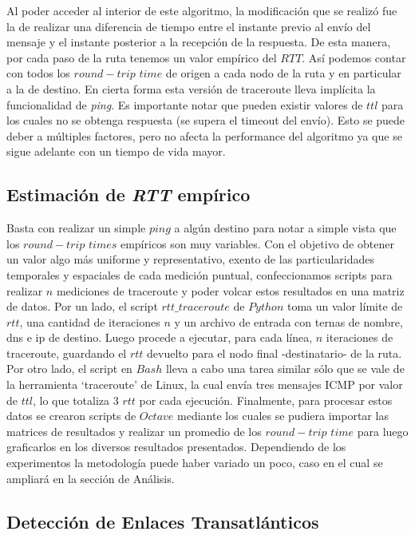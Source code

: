 \indent Al poder acceder al interior de este algoritmo, la modificación que se realizó fue la de realizar una diferencia de tiempo entre el instante previo al envío del mensaje y el instante posterior a la recepción de la respuesta. De esta manera, por cada paso de la ruta tenemos un valor empírico del $RTT$. Así podemos contar con todos los $round-trip$ $time$ de origen a cada nodo de la ruta y en particular a la de destino. En cierta forma esta versión de traceroute lleva implícita la funcionalidad de \textsl{ping}. Es importante notar que pueden existir valores de $ttl$ para los cuales no se obtenga respuesta (se supera el timeout del envío). Esto se puede deber a múltiples factores, pero no afecta la performance del algoritmo ya que se sigue adelante con un tiempo de vida mayor.\\

\subsection{Estimación de \textsl{RTT} empírico}

Basta con realizar un simple $ping$ a algún destino para notar a simple vista que los $round-trip$ $times$ empíricos son muy variables. Con el objetivo de obtener un valor algo más uniforme y representativo, exento de las particularidades temporales y espaciales de cada medición puntual, confeccionamos scripts para realizar $n$ mediciones de traceroute y poder volcar estos resultados en una matriz de datos. Por un lado, el script $rtt\_traceroute$ de $Python$ toma un valor límite de $rtt$, una cantidad de iteraciones $n$ y un archivo de entrada con ternas de nombre, dns e ip de destino. Luego procede a ejecutar, para cada línea, $n$ iteraciones de traceroute, guardando el $rtt$ devuelto para el nodo final -destinatario- de la ruta. Por otro lado, el script en $Bash$ lleva a cabo una tarea similar sólo que se vale de la herramienta `traceroute' de Linux, la cual envía tres mensajes ICMP por valor de $ttl$, lo que totaliza 3 $rtt$ por cada ejecución. Finalmente, para procesar estos datos se crearon scripts de $Octave$ mediante los cuales se pudiera importar las matrices de resultados y realizar un promedio de los $round-trip$ $time$ para luego graficarlos en los diversos resultados presentados. Dependiendo de los experimentos la metodología puede haber variado un poco, caso en el cual se ampliará en la sección de Análisis.

\subsection{Detección de Enlaces Transatlánticos}

